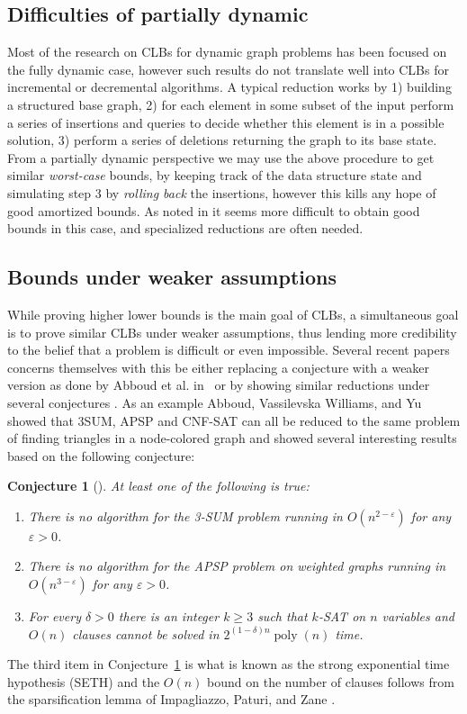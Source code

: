 \documentclass[a4paper,11pt]{article}
\newcommand{\eps}{\varepsilon}
\def\poly{\operatorname{poly}}
\newtheorem{conjecture}{Conjecture}
\theoremstyle{definition}
\begin{document}
\subsection{Difficulties of partially dynamic}
Most of the research on CLBs for dynamic graph problems has been focused on the
fully dynamic case, however such results do not translate well into CLBs for
incremental or decremental algorithms. A typical reduction works by 1) building
a structured base graph, 2) for each element in some subset of the input
perform a series of insertions and queries to decide whether this element is in
a possible solution, 3) perform a series of deletions returning the graph to
its base state. From a partially dynamic perspective we may use the above
procedure to get similar \emph{worst-case} bounds, by keeping track of the data
structure state and simulating step 3 by \emph{rolling back} the insertions,
however this kills any hope of good amortized bounds. As noted in
\cite{AbboudV14,HenzingerKNS15,KopelowitzPP16} it seems more difficult to
obtain good bounds in this case, and specialized reductions are often
needed.

\subsection{Bounds under weaker assumptions}
While proving higher lower bounds is the main goal of CLBs, a simultaneous goal
is to prove similar CLBs under weaker assumptions, thus lending more credibility
to the belief that a problem is difficult or even impossible. Several recent
papers concerns themselves with this be either replacing a conjecture with a
weaker version as done by Abboud et al. in~\cite{AbboudHVW16} or by showing
similar reductions under several conjectures
\cite{VassilevskaW09,AbboudL13,AbboudVW14,AbboudVY15,HenzingerKNS15}.
As an example Abboud, Vassilevska Williams, and Yu~\cite{AbboudVY15} showed that
3SUM, APSP and CNF-SAT can all be reduced to the same problem of finding
triangles in a node-colored graph and showed several interesting results based
on the following conjecture:
\begin{conjecture}[\cite{AbboudVY15}]\label{conj:tc}
    At least one of the following is true:
    \begin{enumerate}
        \item There is no algorithm for the 3-SUM problem running in
            $O(n^{2-\eps})$ for any $\eps > 0$.
        \item There is no algorithm for the APSP problem on weighted graphs
            running in $O(n^{3-\eps})$ for any $\eps>0$.
        \item For every $\delta>0$ there is an integer $k\ge 3$ such that
            $k$-SAT on $n$ variables and $O(n)$ clauses cannot be solved in
            $2^{(1-\delta)n}\poly(n)$ time.
    \end{enumerate}
\end{conjecture}
The third item in Conjecture~\ref{conj:tc} is what is known as the strong
exponential time hypothesis (SETH) \cite{ImpagliazzoP01} and the $O(n)$ bound
on the number of clauses follows from the sparsification lemma of Impagliazzo,
Paturi, and Zane \cite{ImpagliazzoPZ01}.
\end{document}
